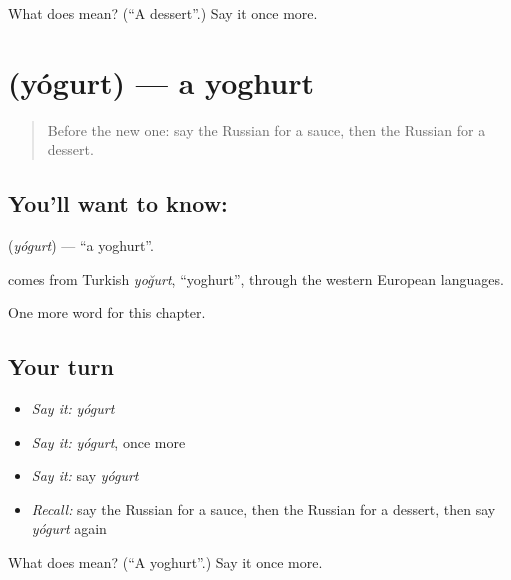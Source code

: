 \begin{tcolorbox}[breakable,colback=teal!4,colframe=teal!35!black,title={Before you move on}]
What does  mean? (\textquotedblleft{}A dessert\textquotedblright{}.) Say it once more.
\end{tcolorbox}
\section[\texorpdfstring{\ru{йогурт} (yógurt)}{йогурт (yógurt)}]{ (yógurt) — a yoghurt}

\label{lesson:RU-C106-yoghurt}



\begin{quote}
Before the new one: say the Russian for a sauce, then the Russian for a dessert.
\end{quote}

\subsection*{You'll want to know: }
\textbf{} (\emph{yógurt}) — \textquotedblleft{}a yoghurt\textquotedblright{}.

\begin{cousinweb}
\textbf{} comes from Turkish \emph{yoğurt}, \textquotedblleft{}yoghurt\textquotedblright{}, through the western European languages.
\end{cousinweb}

\begin{grammarlens}[title={What you've built}]
One more word for this chapter.
\end{grammarlens}

\subsection*{Your turn}
\begin{itemize}
\raggedright
  \item \emph{Say it:} \emph{yógurt}
  \item \emph{Say it:} \emph{yógurt}, once more
  \item \emph{Say it:} say \emph{yógurt}
  \item \emph{Recall:} say the Russian for a sauce, then the Russian for a dessert, then say \emph{yógurt} again
\end{itemize}

\begin{tcolorbox}[breakable,colback=teal!4,colframe=teal!35!black,title={Before you move on}]
What does  mean? (\textquotedblleft{}A yoghurt\textquotedblright{}.) Say it once more.
\end{tcolorbox}
